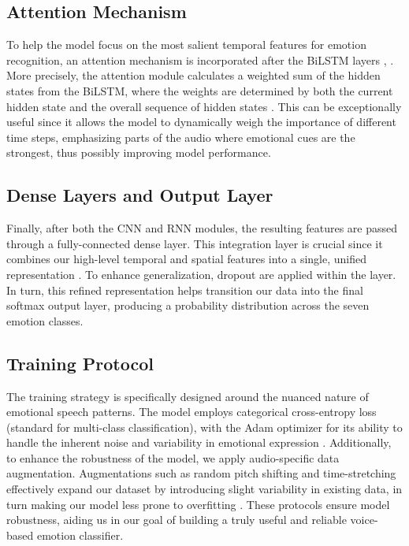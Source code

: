 \documentclass[../main.tex]{subfiles}
\begin{document}
\subsection{Attention Mechanism}
To help the model focus on the most salient temporal features for emotion
recognition, an attention mechanism is incorporated after the BiLSTM layers \citep{Peng2020}, \citep{Chen2018}.
More precisely, the attention module calculates a weighted sum of the hidden
states from the BiLSTM, where the weights are determined by both the current hidden
state and the overall sequence of hidden states \citep{Chen2018}. This can be exceptionally
useful since it allows the model to dynamically weigh the importance of
different time steps, emphasizing parts of the audio where emotional cues are
the strongest, thus possibly improving model performance.

\subsection{Dense Layers and Output Layer}
Finally, after both the CNN and RNN modules, the resulting features are passed
through a fully-connected dense layer. This integration layer is crucial since
it combines our high-level temporal and spatial features into a single, unified
representation \citep{Chen2018}. To enhance generalization, dropout are applied within the layer.
In turn, this refined representation helps transition our data into the final
softmax output layer, producing a probability distribution across the seven
emotion classes.

\subsection{Training Protocol}
The training strategy is specifically designed around the nuanced nature of
emotional speech patterns. The model employs categorical cross-entropy loss
(standard for multi-class classification), with the Adam optimizer for its
ability to handle the inherent noise and variability in emotional expression \citep{Bhatlawande2024}.
Additionally, to enhance the robustness of the model, we apply audio-specific
data augmentation. Augmentations such as random pitch shifting and
time-stretching effectively expand our dataset by introducing slight variability
in existing data, in turn making our model less prone to overfitting \citep{Bhatlawande2024}. These protocols ensure model robustness, aiding us in our goal of building a truly useful and reliable voice-based emotion classifier.
\end{document}
